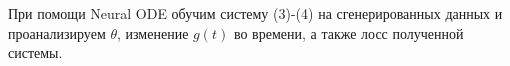\documentclass[a4paper,14pt]{article}
\theoremstyle{plain} %
\theoremstyle{definition} %
\theoremstyle{remark} %
\begin{document}
        При помощи Neural ODE обучим систему (3)-(4) на сгенерированных данных и проанализируем $\theta$, изменение $g(t)$ во времени, а также лосс полученной системы.

        
        
        
        
	\nocite{*}
        
\end{document}

